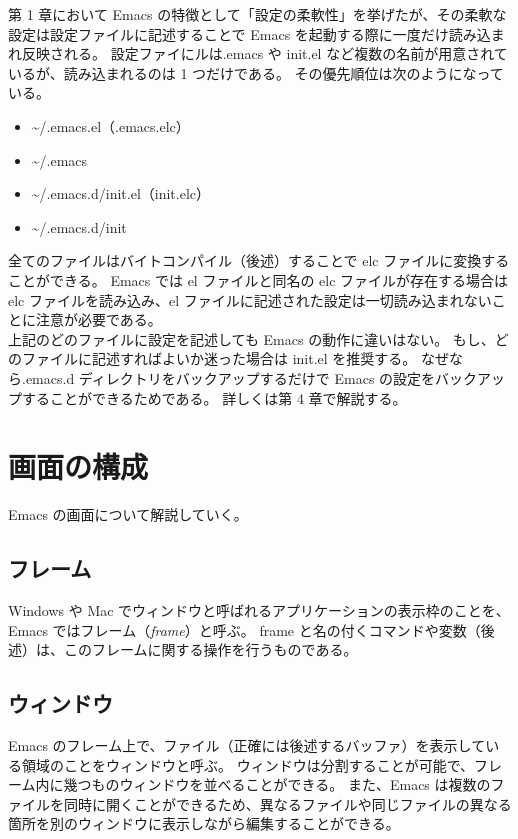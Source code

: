 第 1 章において Emacs の特徴として「設定の柔軟性」を挙げたが、その柔軟な設定は設定ファイルに記述することで Emacs を起動する際に一度だけ読み込まれ反映される。
設定ファイにルは.emacs や init.el など複数の名前が用意されているが、読み込まれるのは 1 つだけである。
その優先順位は次のようになっている。
\begin{itemize}\setlength{\leftskip}{+0.00zw}%
\item[\ajMaru{1}] \textasciitilde/.emacs.el（.emacs.elc）
\item[\ajMaru{2}] \textasciitilde/.emacs
\item[\ajMaru{3}] \textasciitilde/.emacs.d/init.el（init.elc）
\item[\ajMaru{4}] \textasciitilde/.emacs.d/init
\end{itemize}
全てのファイルはバイトコンパイル（後述）することで elc ファイルに変換することができる。
Emacs では el ファイルと同名の elc ファイルが存在する場合は elc ファイルを読み込み、el ファイルに記述された設定は一切読み込まれないことに注意が必要である。\\

上記のどのファイルに設定を記述しても Emacs の動作に違いはない。
もし、どのファイルに記述すればよいか迷った場合は init.el を推奨する。
なぜなら.emacs.d ディレクトリをバックアップするだけで Emacs の設定をバックアップすることができるためである。
詳しくは第 4 章で解説する。
\section{画面の構成}
Emacs の画面について解説していく。
\subsection{フレーム}
Windows や Mac でウィンドウと呼ばれるアプリケーションの表示枠のことを、Emacs ではフレーム（\emph{frame}）と呼ぶ。
frame と名の付くコマンドや変数（後述）は、このフレームに関する操作を行うものである。
\subsection{ウィンドウ}
Emacs のフレーム上で、ファイル（正確には後述するバッファ）を表示している領域のことをウィンドウと呼ぶ。
ウィンドウは分割することが可能で、フレーム内に幾つものウィンドウを並べることができる。
また、Emacs は複数のファイルを同時に開くことができるため、異なるファイルや同じファイルの異なる箇所を別のウィンドウに表示しながら編集することができる。
